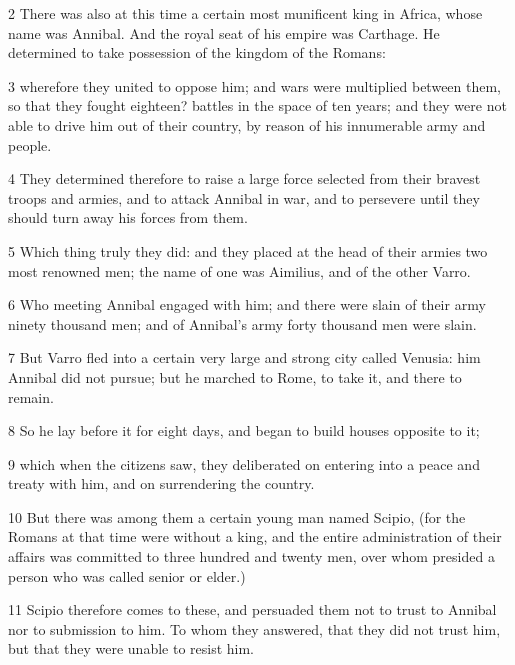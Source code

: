 \par 2 There was also at this time a certain most munificent king in Africa, whose name was Annibal. And the royal seat of his empire was Carthage. He determined to take possession of the kingdom of the Romans: 

\par 3 wherefore they united to oppose him; and wars were multiplied between them, so that they fought eighteen? battles in the space of ten years; and they were not able to drive him out of their country, by reason of his innumerable army and people. 

\par 4 They determined therefore to raise a large force selected from their bravest troops and armies, and to attack Annibal in war, and to persevere until they should turn away his forces from them. 

\par 5 Which thing truly they did: and they placed at the head of their armies two most renowned men; the name of one was Aimilius, and of the other Varro. 

\par 6 Who meeting Annibal engaged with him; and there were slain of their army ninety thousand men; and of Annibal’s army forty thousand men were slain. 

\par 7 But Varro fled into a certain very large and strong city called Venusia: him Annibal did not pursue; but he marched to Rome, to take it, and there to remain. 

\par 8 So he lay before it for eight days, and began to build houses opposite to it; 

\par 9 which when the citizens saw, they deliberated on entering into a peace and treaty with him, and on surrendering the country. 

\par 10 But there was among them a certain young man named Scipio, (for the Romans at that time were without a king, and the entire administration of their affairs was committed to three hundred and twenty men, over whom presided a person who was called senior or elder.) 

\par 11 Scipio therefore comes to these, and persuaded them not to trust to Annibal nor to submission to him. To whom they answered, that they did not trust him, but that they were unable to resist him. 

